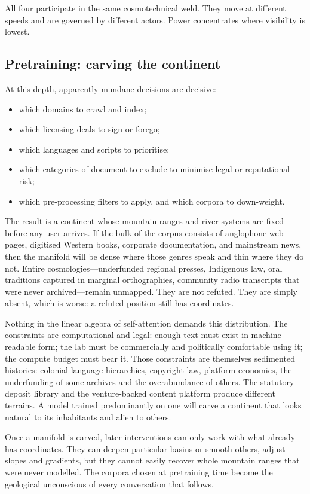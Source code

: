 All four participate in the same cosmotechnical weld. They move at different speeds and are governed by different actors. Power concentrates where visibility is lowest.

\subsection{Pretraining: carving the continent}

At this depth, apparently mundane decisions are decisive:

\begin{itemize}
  \item which domains to crawl and index;
  \item which licensing deals to sign or forego;
  \item which languages and scripts to prioritise;
  \item which categories of document to exclude to minimise legal or reputational risk;
  \item which pre-processing filters to apply, and which corpora to down-weight.
\end{itemize}

The result is a continent whose mountain ranges and river systems are fixed before any user arrives. If the bulk of the corpus consists of anglophone web pages, digitised Western books, corporate documentation, and mainstream news, then the manifold will be dense where those genres speak and thin where they do not. Entire cosmologies---underfunded regional presses, Indigenous law, oral traditions captured in marginal orthographies, community radio transcripts that were never archived---remain unmapped. They are not refuted. They are simply absent, which is worse: a refuted position still has coordinates.

Nothing in the linear algebra of self-attention demands this distribution. The constraints are computational and legal: enough text must exist in machine-readable form; the lab must be commercially and politically comfortable using it; the compute budget must bear it. Those constraints are themselves sedimented histories: colonial language hierarchies, copyright law, platform economics, the underfunding of some archives and the overabundance of others. The statutory deposit library and the venture-backed content platform produce different terrains. A model trained predominantly on one will carve a continent that looks natural to its inhabitants and alien to others.

Once a manifold is carved, later interventions can only work with what already has coordinates. They can deepen particular basins or smooth others, adjust slopes and gradients, but they cannot easily recover whole mountain ranges that were never modelled. The corpora chosen at pretraining time become the geological unconscious of every conversation that follows.

